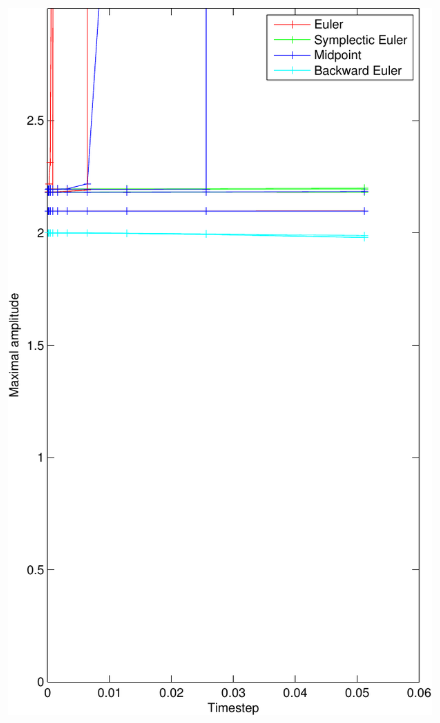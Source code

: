 \begin{figure}[]
	\begin{center}
		\includegraphics*[width=\textwidth]{graphics/StabilityDamp1_9-crop.pdf}
	\end{center}
	\caption{}
	\label{fig:}
\end{figure}
